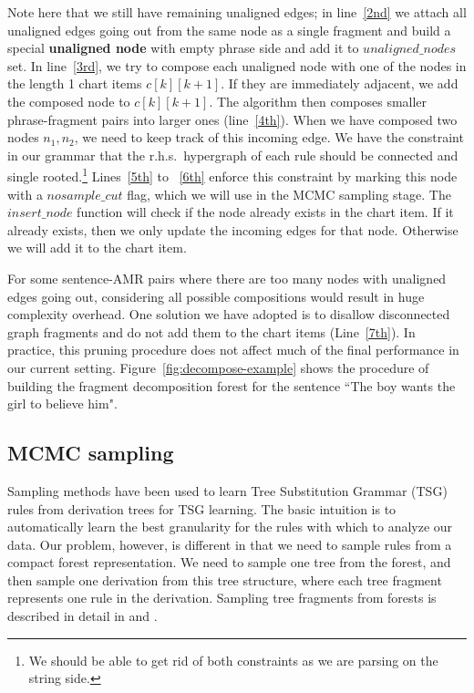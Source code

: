 Note here that we still have remaining unaligned edges; in line~\ref{2nd} we attach all unaligned edges going out from the same node as a single fragment and build a special 
{\bf unaligned node} with empty phrase side and add it to $unaligned\_nodes$ set. In line~\ref{3rd}, we try to compose each unaligned node with one of the nodes in the length 1 chart items
$c[k][k+1]$. If they are immediately adjacent, we add the composed node to $c[k][k+1]$. 
The algorithm then composes smaller phrase-fragment pairs into larger ones (line~\ref{4th}). When we have composed two nodes $n_1, n_2$, we need to keep track of this
incoming edge. We have the constraint in our grammar that the r.h.s.\ hypergraph of each rule
should be connected and single rooted.\footnote{We should be able to get rid of both constraints as we are parsing on the string side.} Lines~\ref{5th} to ~\ref{6th} enforce this constraint
by marking this node with a $nosample\_cut$ flag, which we will use in the MCMC sampling stage.
The $insert\_node$ function will check if the node already exists in the chart item. If it already exists, then we only update the incoming edges for that node. Otherwise 
we will add it to the chart item. 


For some sentence-AMR pairs where there are too many nodes with unaligned edges going out, considering all possible compositions would result in
huge complexity overhead. One solution we have adopted is to disallow disconnected graph fragments and do not add them to the chart items (Line~\ref{7th}). In practice, this pruning 
procedure does not affect much of the final performance in our current setting.
Figure~\ref{fig:decompose-example} shows the procedure of building the fragment decomposition forest 
for the sentence ``The boy wants the girl to believe him".
\subsection{MCMC sampling}
Sampling methods have been used to learn Tree Substitution Grammar (TSG) rules from derivation trees \cite{cohn-2009-inducing,PostGildea-acl09} for TSG learning. 
The basic intuition is to automatically learn the best granularity for the rules
with which to analyze our data. Our problem, however, is different in that we need to
sample rules from a compact forest representation. We need to sample one tree from the forest, and then
sample one derivation from this tree structure, where each tree fragment represents one rule in the derivation. Sampling tree fragments from forests is described in detail in  and .


